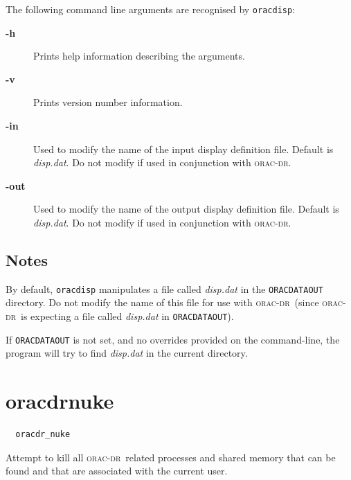 \documentclass[twoside,11pt]{article}
\renewcommand{\_}{\texttt{\symbol{95}}}
\newcommand{\oracdr}{\textsc{orac-dr}}
\begin{document}
The following command line arguments are recognised by \texttt{oracdisp}:

\begin{description}
\item[\textbf{-h}] \mbox{}

Prints help information describing the arguments.

\item[\textbf{-v}] \mbox{}

Prints version number information.

\item[\textbf{-in}] \mbox{}

Used to modify the name of the input display definition file.
Default is \emph{disp.dat}. Do not modify if used in conjunction with
\oracdr.

\item[\textbf{-out}] \mbox{}

Used to modify the name of the output display definition file.
Default is \emph{disp.dat}. Do not modify if used in conjunction with
\oracdr.

\end{description}
\subsection*{Notes\label{oracdisp_NOTES}}

By default, \texttt{oracdisp} manipulates a file called \emph{disp.dat}
in the \texttt{ORAC\_DATA\_OUT} directory. Do not modify the name of this
file for use with \oracdr\ (since \oracdr\ is expecting a file
called \emph{disp.dat} in \texttt{ORAC\_DATA\_OUT}).



If \texttt{ORAC\_DATA\_OUT} is not set, and no overrides provided on the
command-line, the program will try to find \emph{disp.dat} in the current
directory.

\section{oracdr\_nuke\label{oracdr_nuke}}

\begin{verbatim}
  oracdr_nuke
\end{verbatim}

Attempt to kill all \oracdr\ related processes and shared memory that
can be found and that are associated with the current user.
\end{document}
